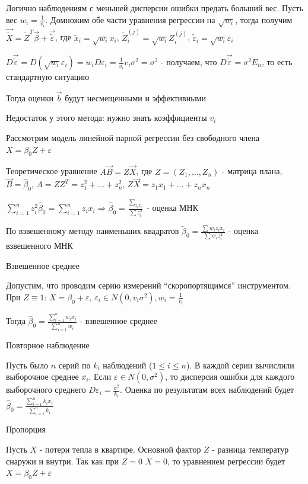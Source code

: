 \documentclass[12pt]{article}
\begin{document}
Логично наблюдениям с меньшей дисперсии ошибки предать больший вес. Пусть вес $w_i = \frac{1}{v_i}$. Домножим обе части уравнения регрессии на $\sqrt{w_i}$, тогда получим $\vec \tilde{X} = \tilde Z^T \vec \beta + \vec \tilde{\varepsilon}$, где $\tilde x_i=  \sqrt{w_i} x_i$, $\tilde Z^{(j)}_i = \sqrt{w_i} Z^{(j)}_i$, $\tilde \varepsilon_i = \sqrt{w_i} \varepsilon_i$

$D \vec \tilde{\varepsilon} = D(\sqrt{w_i} \varepsilon_i) = w_i D \varepsilon_i = \frac{1}{v_i} v_i \sigma^2 = \sigma^2$ - получаем, что $D \vec \tilde{\varepsilon} = \sigma^2 E_n$, то есть стандартную ситуацию

Тогда оценки $\vec b$ будут несмещенными и эффективными

Недостаток у этого метода: нужно знать коэффициенты $v_i$

\Ex Рассмотрим модель линейной парной регрессии без свободного члена $X = \beta_0 Z + \varepsilon$

Теоретическое уравнение $A \vec B = Z \vec X$, где $Z = \left(Z_1, \dots, Z_n\right)$ - матрица плана, $\vec B = \hat \beta_0$, $A = Z Z^T = z_1^2 + \dots + z_n^2$, $Z \vec X = z_1 x_1 + \dots + z_n x_n$

$\sum_{i = 1}^n z^2_i \hat \beta_0 = \sum_{i = 1}^n z_i x_i \Longrightarrow \hat \beta_0 = \frac{\sum_{z_i x_i}}{\sum z^2_i}$ - оценка МНК 

По взвешенному методу наименьших квадратов $\tilde \beta_0 = \frac{\sum w_i z_i x_i}{\sum w_i z_i^2}$ - оценка взвешенного МНК

 Взвешенное среднее

Допустим, что проводим серию измерений \enquote{скоропортящимся} инструментом. При $Z \equiv 1$: $X = \beta_0 + \varepsilon$, $\varepsilon_i \in N(0, v_i \sigma^2), w_i = \frac{1}{v_i}$

Тогда $\hat \beta_0 = \frac{\sum_{i = 1}^n w_i x_i}{\sum_{i = 1}^n w_i}$ - взвешенное среднее

 Повторное наблюдение

Пусть было $n$ серий по $k_i$ наблюдений ($1 \leq i \leq n$). В каждой серии вычислили выборочное среднее $\overline{x_i}$. 
Если $\varepsilon \in N(0, \sigma^2)$, то дисперсия ошибки для каждого выборочного среднего $D\varepsilon_i = \frac{\sigma^2}{k_i}$. Оценка по результатам всех наблюдений будет $\hat \beta_0 = \frac{\sum_{i = 1}^n k_i \overline{x_i}}{\sum_{i = 1}^n k_i}$

 Пропорция

Пусть $X$ - потери тепла в квартире. Основной фактор $Z$ - разница температур снаружи и внутри. Так как при $Z = 0$ $X = 0$, то уравнением регрессии будет $X = \beta_0 Z + \varepsilon$
\end{document}
